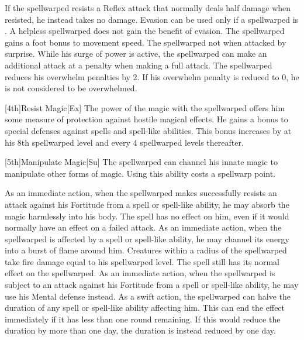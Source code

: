 If the spellwarped resists a Reflex attack that normally deals half damage when resisted, he instead takes no damage.
Evasion can be used only if a spellwarped is \unencumbered.
A helpless spellwarped does not gain the benefit of evasion.
The spellwarped gains a  foot bonus to movement speed.
The spellwarped not \unaware when attacked by surprise.
While his surge of power is active, the spellwarped can make an additional attack at a  penalty when making a full attack.
The spellwarped reduces his overwhelm penalties by 2.
If his overwhelm penalty is reduced to 0, he is not considered to be overwhelmed.

[4th]{Resist Magic}[Ex]
The power of the magic with the spellwarped offers him some measure of protection against hostile magical effects.
He gains a  bonus to special defenses against spells and spell-like abilities.
This bonus increases by  at his 8th spellwarped level and every 4 spellwarped levels thereafter.

[5th]{Manipulate Magic}[Su]
The spellwarped can channel his innate magic to manipulate other forms of magic.
Using this ability costs a spellwarp point.

As an immediate action, when the spellwarped makes successfully resists an attack against his Fortitude from a spell or spell-like ability, he may absorb the magic harmlessly into his body.
The spell has no effect on him, even if it would normally have an effect on a failed attack.
As an immediate action, when the spellwarped is affected by a spell or spell-like ability, he may channel its energy into a burst of flame around him.
Creatures within a \areasmall radius of the spellwarped take fire damage equal to his spellwarped level.
The spell still has its normal effect on the spellwarped.
As an immediate action, when the spellwarped is subject to an attack against his Fortitude from a spell or spell-like ability, he may use his Mental defense instead.
As a swift action, the spellwarped can halve the duration of any spell or spell-like ability affecting him.
This can end the effect immediately if it has less than one round remaining.
If this would reduce the duration by more than one day, the duration is instead reduced by one day.

